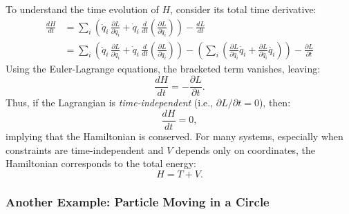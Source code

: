 To understand the time evolution of $H$, consider its total time derivative:
\begin{align}
    \frac{dH}{dt} & = \sum_i\left(\ddot{q}_i\,\frac{\partial L}{\partial \dot{q}_i} + \dot{q}_i\,\frac{d}{dt}\left(\frac{\partial L}{\partial \dot{q}_i}\right)\right) - \frac{dL}{dt} \nonumber \\[1mm]
                  & = \sum_i\left(\ddot{q}_i\,\frac{\partial L}{\partial \dot{q}_i} + \dot{q}_i\,\frac{d}{dt}\left(\frac{\partial L}{\partial \dot{q}_i}\right)\right) - \left(\sum_i\left(\frac{\partial L}{\partial q_i} \dot{q_i} + \frac{\partial L}{\partial \dot{q_i}} \ddot{q_i}\right)\right) - \frac{\partial L}{\partial t}
\end{align}
Using the Euler-Lagrange equations, the bracketed term vanishes, leaving:
\begin{equation}
    \frac{dH}{dt} = -\frac{\partial L}{\partial t}.
\end{equation}
Thus, if the Lagrangian is \emph{time-independent} (i.e., $\partial L/\partial t = 0$), then:
\begin{equation}
    \frac{dH}{dt} = 0,
\end{equation}
implying that the Hamiltonian is conserved. For many systems, especially when constraints are time-independent and $V$ depends only on coordinates, the Hamiltonian corresponds to the total energy:
\begin{equation}
    H = T + V.
\end{equation}

\subsubsection{Another Example: Particle Moving in a Circle}

